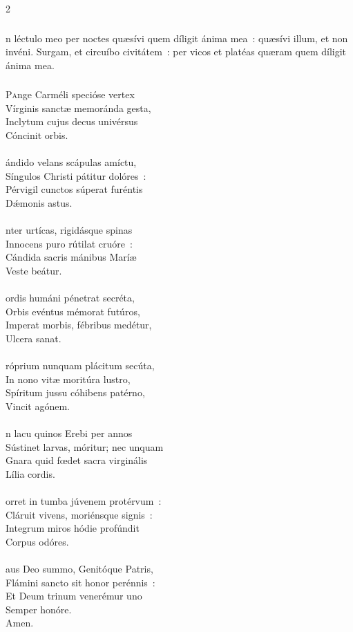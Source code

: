 \documentclass[9pt,twoside]{extarticle}
\begin{document}
\begin{multicols}{2}
{\subsubsection*{}
n léctulo meo per noctes quæsívi quem díligit ánima mea~: quæsívi illum, et non invéni. Surgam, et circuíbo civitátem~: per vicos et platéas quæram quem díligit ánima mea.

\subsubsection*{\center {}}
\lettrine{P}ange Carméli specióse vertex\\
Vírginis sanctæ memoránda gesta,\\
Inclytum cujus decus univérsus\\
Cóncinit orbis.\\
\\
ándido velans scápulas amíctu,\\
Síngulos Christi pátitur dolóres~:\\
Pérvigil cunctos súperat furéntis\\
Dǽmonis astus.\\
\\
nter urtícas, rigidásque spinas\\
Innocens puro rútilat cruóre~:\\
Cándida sacris mánibus Maríæ\\
Veste beátur.\\
\\
ordis humáni pénetrat secréta,\\
Orbis evéntus mémorat futúros,\\
Imperat morbis, fébribus medétur,\\
Ulcera sanat.\\
\\
róprium nunquam plácitum secúta,\\
In nono vitæ moritúra lustro,\\
Spíritum jussu cóhibens patérno,\\
Vincit agónem.\\
\\
n lacu quinos Erebi per annos\\
Sústinet larvas, móritur; nec unquam\\
Gnara quid fœdet sacra virginális\\
Lília cordis.\\
\\
orret in tumba júvenem protérvum~:\\
Cláruit vivens, moriénsque signis~:\\
Integrum miros hódie profúndit\\
Corpus odóres.\\
\\
aus Deo summo, Genitóque Patris,\\
Flámini sancto sit honor perénnis~:\\
Et Deum trinum venerémur uno\\
Semper honóre.\\
Amen.

}
\end{multicols}
\end{document}

